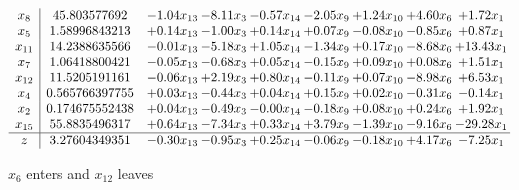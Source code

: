 \documentclass[9pt]{article}
\begin{document}
 \[\begin{array}{c| c c@{\hskip 2pt} c@{\hskip 2pt} c@{\hskip 2pt} c@{\hskip 2pt} c@{\hskip 2pt} c@{\hskip 2pt} c@{\hskip 2pt} }
 x_{8}   &  45.803577692 & -1.04 x_{13} & -8.11 x_{3} & -0.57 x_{14} & -2.05 x_{9} & +  1.24 x_{10} & +  4.60 x_{6} & +  1.72 x_{1}\\
 x_{5}   &  1.58996843213 & +  0.14 x_{13} & -1.00 x_{3} & +  0.14 x_{14} & +  0.07 x_{9} & -0.08 x_{10} & -0.85 x_{6} & +  0.87 x_{1}\\
 x_{11}   &  14.2388635566 & -0.01 x_{13} & -5.18 x_{3} & +  1.05 x_{14} & -1.34 x_{9} & +  0.17 x_{10} & -8.68 x_{6} & + 13.43 x_{1}\\
 x_{7}   &  1.06418800421 & -0.05 x_{13} & -0.68 x_{3} & +  0.05 x_{14} & -0.15 x_{9} & +  0.09 x_{10} & +  0.08 x_{6} & +  1.51 x_{1}\\
 x_{12}   &  11.5205191161 & -0.06 x_{13} & +  2.19 x_{3} & +  0.80 x_{14} & -0.11 x_{9} & +  0.07 x_{10} & -8.98 x_{6} & +  6.53 x_{1}\\
 x_{4}   &  0.565766397755 & +  0.03 x_{13} & -0.44 x_{3} & +  0.04 x_{14} & +  0.15 x_{9} & +  0.02 x_{10} & -0.31 x_{6} & -0.14 x_{1}\\
 x_{2}   &  0.174675552438 & +  0.04 x_{13} & -0.49 x_{3} & -0.00 x_{14} & -0.18 x_{9} & +  0.08 x_{10} & +  0.24 x_{6} & +  1.92 x_{1}\\
 x_{15}   &  55.8835496317 & +  0.64 x_{13} & -7.34 x_{3} & +  0.33 x_{14} & +  3.79 x_{9} & -1.39 x_{10} & -9.16 x_{6} & -29.28 x_{1}\\
\hline
z    &  3.27604349351 & -0.30 x_{13} & -0.95 x_{3} & +  0.25 x_{14} & -0.06 x_{9} & -0.18 x_{10} & +  4.17 x_{6} & -7.25 x_{1}\\
\end{array}\]


 $ x_{6} $ enters and $ x_{12} $ leaves 
\end{document}
